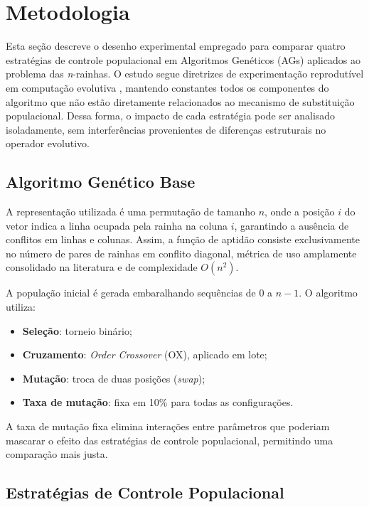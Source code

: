 \section{Metodologia}
\label{sec:metodologia}

Esta seção descreve o desenho experimental empregado para comparar quatro estratégias de controle populacional em Algoritmos Genéticos (AGs) aplicados ao problema das \textit{n}-rainhas. O estudo segue diretrizes de experimentação reprodutível em computação evolutiva \cite{eiben2015introduction}, mantendo constantes todos os componentes do algoritmo que não estão diretamente relacionados ao mecanismo de substituição populacional. Dessa forma, o impacto de cada estratégia pode ser analisado isoladamente, sem interferências provenientes de diferenças estruturais no operador evolutivo.

\subsection{Algoritmo Genético Base}

A representação utilizada é uma permutação de tamanho $n$, onde a posição $i$ do vetor indica a linha ocupada pela rainha na coluna $i$, garantindo a ausência de conflitos em linhas e colunas. Assim, a função de aptidão consiste exclusivamente no número de pares de rainhas em conflito diagonal, métrica de uso amplamente consolidado na literatura e de complexidade $O(n^2)$.

A população inicial é gerada embaralhando sequências de $0$ a $n-1$. O algoritmo utiliza:
\begin{itemize}
    \item \textbf{Seleção}: torneio binário;
    \item \textbf{Cruzamento}: \textit{Order Crossover} (OX), aplicado em lote;
    \item \textbf{Mutação}: troca de duas posições (\textit{swap});
    \item \textbf{Taxa de mutação}: fixa em 10\% para todas as configurações.
\end{itemize}

A taxa de mutação fixa elimina interações entre parâmetros que poderiam mascarar o efeito das estratégias de controle populacional, permitindo uma comparação mais justa.

\subsection{Estratégias de Controle Populacional}

